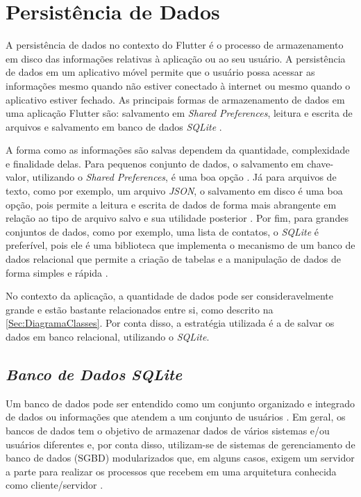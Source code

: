 


\section{Persistência de Dados}
A persistência de dados no contexto do Flutter é o processo de armazenamento em disco das informações relativas à aplicação ou ao seu usuário.
A persistência de dados em um aplicativo móvel permite que o usuário possa acessar as informações mesmo quando não estiver conectado à internet ou mesmo quando o aplicativo estiver fechado. As principais formas de armazenamento de dados em uma aplicação Flutter são: salvamento em \textit{Shared Preferences}, leitura e escrita de arquivos e salvamento em banco de dados \textit{SQLite} \cite{persistence}.

A forma como as informações são salvas dependem da quantidade, complexidade e finalidade delas. Para pequenos conjunto de dados, o salvamento em chave-valor, utilizando o \textit{Shared Preferences}, é uma boa opção \cite{shared_preferences}. Já para arquivos de texto, como por exemplo, um arquivo \textit{JSON}, o salvamento em disco é uma boa opção, pois permite a leitura e escrita de dados de forma mais abrangente em relação ao tipo de arquivo salvo e sua utilidade posterior \cite{reading_writing_files}. Por fim, para grandes conjuntos de dados, como por exemplo, uma lista de contatos, o \textit{SQLite} é preferível, pois ele é uma biblioteca que implementa o mecanismo de um banco de dados relacional \cite{sqlite-org} que permite a criação de tabelas e a manipulação de dados de forma simples e rápida \cite{sqlite-flutter} \cite{sqlite_features}.

No contexto da aplicação, a quantidade de dados pode ser consideravelmente grande e estão bastante relacionados entre si, como descrito na \ref{Sec:DiagramaClasses}. Por conta disso, a estratégia utilizada é a de salvar os dados em banco relacional, utilizando o \textit{SQLite}.

\subsection{\textit{Banco de Dados SQLite}}
Um banco de dados pode ser entendido como um conjunto organizado e integrado de dados ou informações que atendem a um conjunto de usuários \cite{heuser09banco} \cite{oracle}. Em geral, os bancos de dados tem o objetivo de armazenar dados de vários sistemas e/ou usuários diferentes e, por conta disso, utilizam-se de sistemas de gerenciamento de banco de dados (SGBD) modularizados \cite{heuser09banco} que, em alguns casos, exigem um servidor a parte para realizar os processos que recebem em uma arquitetura conhecida como cliente/servidor \cite{sqlitetutorial_net}.

